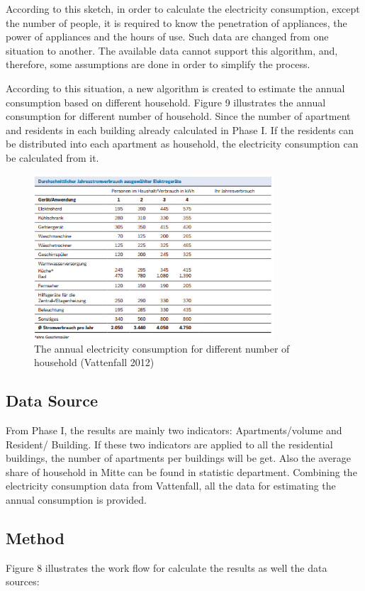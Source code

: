 \documentclass[11pt]{article}
\begin{document}
According to this sketch, in order to calculate the electricity consumption, except the number of people, it is required to know the penetration of appliances, the power of appliances and the hours of use. Such data are changed from one situation to another. The available data cannot support this algorithm, and, therefore, some assumptions are done in order to simplify the process.

According to this situation, a new algorithm is created to estimate the annual consumption based on different household. Figure 9 illustrates the annual consumption for different number of household. Since the number of apartment and residents in each building already calculated in Phase I. If  the residents can be distributed into each apartment as household, the electricity consumption can be calculated from it.

\begin{figure}[H]
	\centering
	\includegraphics[width=0.8\textwidth]{fig9.png}
	\caption{The annual electricity consumption for different number of household (Vattenfall 2012) }
	\label{fig:figure9}
\end{figure}

\subsection{Data Source}
From Phase I, the results are mainly two indicators: Apartments/volume and Resident/ Building. If these two indicators are applied to all the residential buildings, the number of apartments per buildings will be get. Also the average share of household in Mitte can be found in statistic department. Combining the electricity consumption data from Vattenfall, all the data for estimating the annual consumption is provided.

\subsection{Method}
Figure 8 illustrates the work flow for calculate the results as well the data sources:
\end{document}
